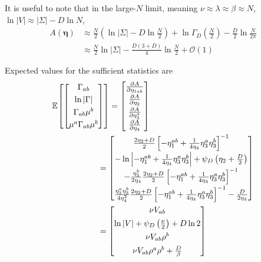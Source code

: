 \documentclass[aps,showpacs,twocolumn,prd,superscriptaddress,nofootinbib]{revtex4}
\newcommand{\nn}{\nonumber}
\newcommand{\E}[1]{{\mathbb E}_{#1}\!}
\begin{document}
It is useful to note that in the large-$N$ limit, meaning $\nu\approx\lambda\approx\beta\approx N$, $\ln|V|\approx|\Sigma|-D\ln N$,
\begin{align}
  A(\bm\eta)&\approx\frac N2\left(\ln|\Sigma|-D\ln\frac N2\right)+\ln \Gamma_D\left(\frac N2\right)-\frac D2\ln\frac N{2\pi}\nn\\
  &\approx\frac N2\ln|\Sigma|-\frac {D(3+D)}4\ln \frac N2
  +\mathcal{O}(1)
\end{align}

Expected values for the sufficient statistics are
\begin{align*}
\E{}\left[ 
\begin{bmatrix}
  \Gamma_{ab}\\[.7ex]
  \ln\left|\Gamma\right|\\[.7ex]
  \Gamma_{ab}\mu^b\\[.7ex]
  \mu^a\Gamma_{ab}\mu^b
\end{bmatrix}
\right]
&=
\begin{bmatrix}
  \frac{\partial A}{\partial\eta_{1ab}}\\[.7ex]
  \frac{\partial A}{\partial\eta_{2}}  \\[.7ex]
  \frac{\partial A}{\partial\eta_{3}^a}\\[.7ex]
  \frac{\partial A}{\partial\eta_{4}}  
\end{bmatrix}\nn\\
&\mkern-25mu=
\begin{bmatrix}
      \frac{2\eta_2+D}2\left[-\eta_1^{ab}+\frac1{4\eta_4}\eta_3^a\eta_3^b\right]^{-1}\\[1ex]
      -\ln\left|-\eta_1^{ab}+\frac1{4\eta_4}\eta_3^a\eta_3^b\right|+\psi_D\left(\eta_2+\frac{D}2\right)\\[1ex]
      -\frac{\eta_3^b}{2\eta_4}\frac{2\eta_2+D}2\left[-\eta_1^{ab}+\frac1{4\eta_4}\eta_3^a\eta_3^b\right]^{-1}\\[1ex]
        \frac{\eta_3^a\eta_3^b}{4\eta_4^2}\frac{2\eta_2+D}2\left[-\eta_1^{ab}+\frac1{4\eta_4}\eta_3^a\eta_3^b\right]^{-1}-\frac D{2\eta_4}
\end{bmatrix}\\
&\mkern-25mu=
\begin{bmatrix}
      {\nu}V_{ab}\\[1ex]
      \ln\left|V\right|+\psi_D\left(\frac\nu2\right)+D\ln2\\[1ex]
      \nu V_{ab}\rho^b\\[1ex]
      \nu V_{ab}\rho^a\rho^b+\frac D\beta
\end{bmatrix}
\end{align*}
\end{document}
